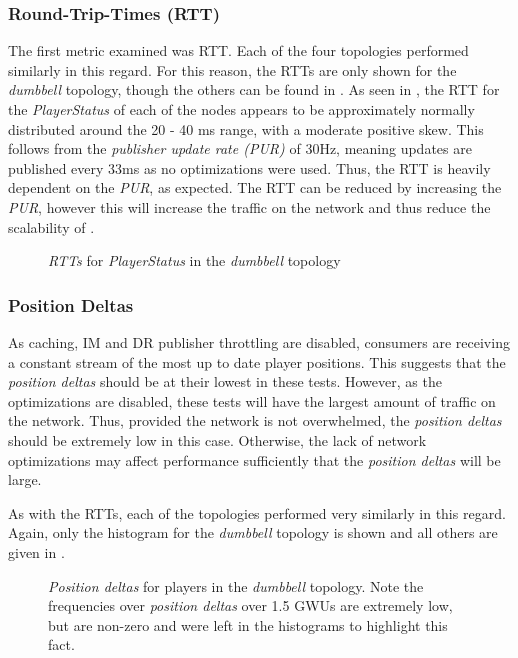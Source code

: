\subsubsection*{Round-Trip-Times (RTT)}
The first metric examined was RTT. Each of the four topologies performed similarly in this regard. For this reason, the RTTs are only shown for the \textit{dumbbell} topology, though the others can be found in . As seen in , the RTT for the \textit{PlayerStatus} of each of the nodes appears to be approximately normally distributed around the 20 - 40 ms range, with a moderate positive skew. This follows from the \textit{publisher update rate (PUR)} of 30Hz, meaning updates are published every 33ms as no optimizations were used. Thus, the RTT is heavily dependent on the \textit{PUR}, as expected. The RTT can be reduced by increasing the \textit{PUR}, however this will increase the traffic on the network and thus reduce the scalability of \game{}.  

\begin{figure}[H]
    \centering
    \caption{\textit{RTTs} for \textit{PlayerStatus} in the \textit{dumbbell} topology}
    \label{fig:eval:basic:rtt}
\end{figure}


\subsubsection*{Position Deltas}
As caching, IM and DR publisher throttling are disabled, consumers are receiving a constant stream of the most up to date player positions. This suggests that the \textit{position deltas} should be at their lowest in these tests. However, as the optimizations are disabled, these tests will have the largest amount of traffic on the network. Thus, provided the network is not overwhelmed, the \textit{position deltas} should be extremely low in this case. Otherwise, the lack of network optimizations may affect performance sufficiently that the \textit{position deltas} will be large. 

As with the RTTs, each of the topologies performed very similarly in this regard. Again, only the histogram for the \textit{dumbbell} topology is shown and all others are given in .

\begin{figure}[H]
    \centering
    \caption{\textit{Position deltas} for players in the \textit{dumbbell} topology. Note the frequencies over \textit{position deltas} over 1.5 GWUs are extremely low, but are non-zero and were left in the histograms to highlight this fact.}
    \label{fig:eval:basic:pos-deltas}
\end{figure}

